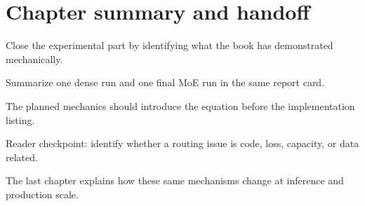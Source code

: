 \section{Chapter summary and handoff}
\label{sec:ch11-chapter-summary-and-handoff}

Close the experimental part by identifying what the book has demonstrated mechanically.



Summarize one dense run and one final MoE run in the same report card.



The planned mechanics should introduce the equation before the implementation listing.





\begin{checkpointbox}
Reader checkpoint: identify whether a routing issue is code, loss, capacity, or data related.
\end{checkpointbox}

The last chapter explains how these same mechanisms change at inference and production scale.

